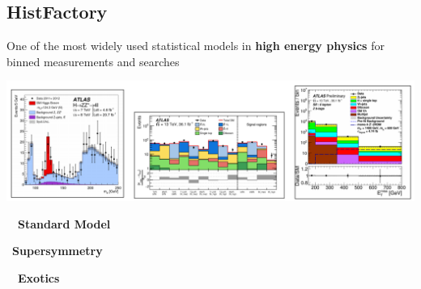 \documentclass[a0,portrait]{a0poster}
\begin{document}
\begin{multicols}{2} %





 \section*{\LARGE\color{MediumBlue} HistFactory}
 \large
 One of the most widely used statistical models in \textbf{high energy physics} for binned measurements and searches

 \begin{center}
  \includegraphics[width=\linewidth]{HistFactory_result_examples.png}
 \end{center}
 \begin{minipage}{0.33\linewidth}
  \begin{flushleft}
   \large\quad~~\textbf{Standard Model}
  \end{flushleft}
 \end{minipage}%
 \quad
 \begin{minipage}{0.33\linewidth}
  \begin{flushleft}
   \large\quad~\textbf{Supersymmetry}
  \end{flushleft}
 \end{minipage}%
 \quad
 \begin{minipage}{0.33\linewidth}
  \begin{flushleft}
   \large\qquad~~\textbf{Exotics}
  \end{flushleft}
 \end{minipage}%


\end{multicols}
\end{document}

